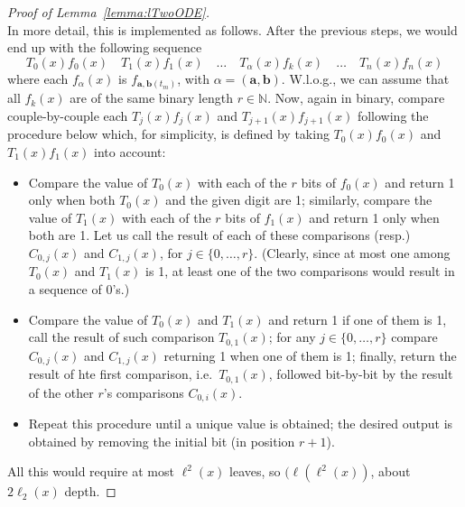 \documentclass[11pt, oneside]{article}
\newenvironment{toappendix}{}{}
\newcommand{\Nat}{\mathbb{N}}
\newcommand{\tu}[1]{\mathbf{#1}}
\theoremstyle{definition}
\begin{document}
\begin{toappendix}
\begin{proof}[Proof of Lemma~\ref{lemma:lTwoODE}]
{        %
        \\
        In more detail, this is implemented as follows.
        After the previous steps, we would end up with the following sequence
        $$
        T_0(x) f_0(x) \quad T_1(x) f_1(x) \quad \dots \quad T_{\alpha}(x) f_k(x) \quad \dots \quad T_n(x)f_n(x)
        $$
        where each $f_{\alpha}(x)$ is  $f_{\tu a, \tu b(t_m)}$, with $\alpha=(\tu a, \tu b)$.
        W.l.o.g., we can assume that all $f_k(x)$ are of the same binary length $r\in \Nat$.
        Now, again in binary, compare couple-by-couple each $T_j(x)f_j(x)$ and $T_{j+1}(x) f_{j+1}(x)$ following the procedure below which, for simplicity, is defined by taking $T_0(x)f_0(x)$ and $T_1(x)f_1(x)$ into account:
        \begin{itemize}
        \itemsep0em
            \item Compare the value of $T_0(x)$ with each of the $r$ bits of $f_0(x)$ and return 1 only when both $T_0(x)$ and the given digit are 1; similarly, compare the value of $T_1(x)$ with each of the $r$ bits of $f_1(x)$ and return 1 only when both are 1.
            Let us call the result of each of these comparisons (resp.) $C_{0,j}(x)$ and $C_{1,j}(x)$, for $j\in \{0, \dots, r\}$.
            (Clearly, since at most one among $T_0(x)$ and $T_1(x)$ is 1, at least one of the two comparisons would result in a sequence of 0's.)
            \item Compare the value of $T_0(x)$ and $T_1(x)$ and return 1 if one of them is 1, call the result of such comparison $T_{0,1}(x)$; for any $j\in \{0,\dots, r\}$ compare $C_{0,j}(x)$ and $C_{1,j}(x)$ returning 1 when one of them is 1; finally, return the result of hte first comparison, i.e.~$T_{0,1}(x)$, followed bit-by-bit by the result of the other $r$'s comparisons $C_{0,i}(x)$.
            \item Repeat this procedure until a unique value is obtained; the desired output is obtained by removing the initial bit (in position $r+1$).        \end{itemize}
  
    All this would require at most $\ell^2(x)$ leaves, so $(\ell(\ell^2(x))$, about $2\ell_2(x)$ depth.
 } %
\end{proof}










\end{toappendix}
\end{document}
